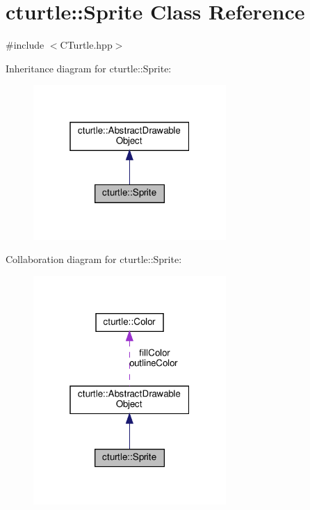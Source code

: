 \hypertarget{classcturtle_1_1Sprite}{}\section{cturtle\+:\+:Sprite Class Reference}
\label{classcturtle_1_1Sprite}


{\ttfamily \#include $<$C\+Turtle.\+hpp$>$}



Inheritance diagram for cturtle\+:\+:Sprite\+:\nopagebreak
\begin{figure}[H]
\begin{center}
\leavevmode
\includegraphics[width=208pt]{classcturtle_1_1Sprite__inherit__graph}
\end{center}
\end{figure}


Collaboration diagram for cturtle\+:\+:Sprite\+:\nopagebreak
\begin{figure}[H]
\begin{center}
\leavevmode
\includegraphics[width=208pt]{classcturtle_1_1Sprite__coll__graph}
\end{center}
\end{figure}
